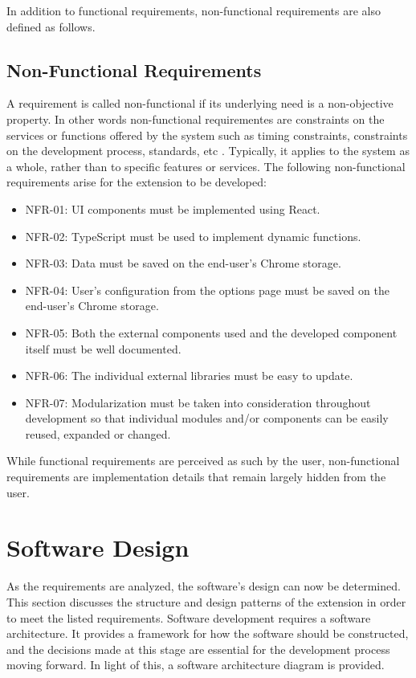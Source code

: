 In addition to functional requirements, non-functional requirements are also defined as follows.

\subsection{Non-Functional Requirements}
A requirement is called non-functional if its underlying need is a non-objective property. In other words non-functional requirementes are constraints on the services or functions offered by the system such as timing constraints, constraints on the development process, standards, etc \autocite{sommerville2011software}. Typically, it applies to the system as a whole, rather than to specific features or services. The following non-functional requirements arise for the extension to be developed:

\begin{itemize}
  \item NFR-01: UI components must be implemented using React.
  \item NFR-02: TypeScript must be used to implement dynamic functions.
  \item NFR-03: Data must be saved on the end-user's Chrome storage.
  \item NFR-04: User's configuration from the options page must be saved on the end-user's Chrome storage.
  \item NFR-05: Both the external components used and the developed component itself must be well documented.
  \item NFR-06: The individual external libraries must be easy to update.
  \item NFR-07: Modularization must be taken into consideration throughout development so that individual modules and/or components can be easily reused, expanded or changed.
\end{itemize}

While functional requirements are perceived as such by the user, non-functional requirements are implementation details that remain largely hidden from the user.

\section{Software Design}
As the requirements are analyzed, the software's design can now be determined. This section discusses the structure and design patterns of the extension in order to meet the listed requirements. Software development requires a software architecture. It provides a framework for how the software should be constructed, and the decisions made at this stage are essential for the development process moving forward. In light of this, a software architecture diagram is provided.

